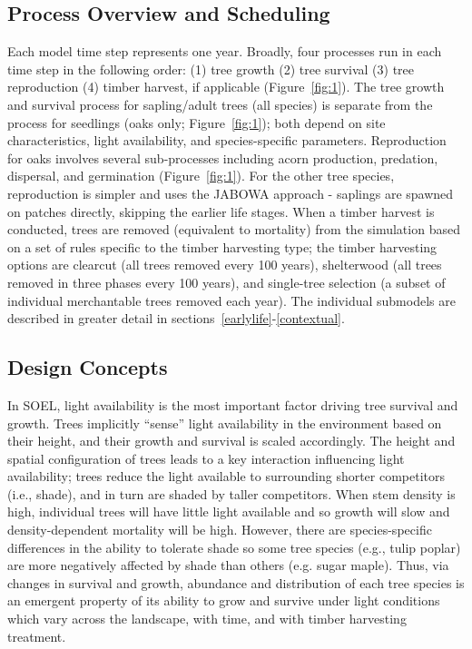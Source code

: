 \documentclass[
11pt, %
a4paper, %
oneside, %
headinclude,footinclude, %
]{scrartcl}
\begin{document}
\subsection{Process Overview and Scheduling}

Each model time step represents one year. Broadly, four processes run in each time step in the following order: (1) tree growth (2) tree survival (3) tree reproduction (4) timber harvest, if applicable (Figure~\ref{fig:1}). The tree growth and survival process for sapling/adult trees (all species) is separate from the process for seedlings (oaks only; Figure~\ref{fig:1}); both depend on site characteristics, light availability, and species-specific parameters. Reproduction for oaks involves several sub-processes including acorn production, predation, dispersal, and germination (Figure~\ref{fig:1}). For the other tree species, reproduction is simpler and uses the JABOWA approach - saplings are spawned on patches directly, skipping the earlier life stages. When a timber harvest is conducted, trees are removed (equivalent to mortality) from the simulation based on a set of rules specific to the timber harvesting type; the timber harvesting options are clearcut (all trees removed every 100 years), shelterwood (all trees removed in three phases every 100 years), and single-tree selection (a subset of individual merchantable trees removed each year). The individual submodels are described in greater detail in sections~\ref{earlylife}-\ref{contextual}.

\subsection{Design Concepts}

In SOEL, light availability is the most important factor driving tree survival and growth. Trees implicitly “sense” light availability in the environment based on their height, and their growth and survival is scaled accordingly. The height and spatial configuration of trees leads to a key interaction influencing light availability; trees reduce the light available to surrounding shorter competitors (i.e., shade), and in turn are shaded by taller competitors. When stem density is high, individual trees will have little light available and so growth will slow and density-dependent mortality will be high. However, there are species-specific differences in the ability to tolerate shade so some tree species (e.g., tulip poplar) are more negatively affected by shade than others (e.g. sugar maple). Thus, via changes in survival and growth, abundance and distribution of each tree species is an emergent property of its ability to grow and survive under light conditions which vary across the landscape, with time, and with timber harvesting treatment.
\end{document}

